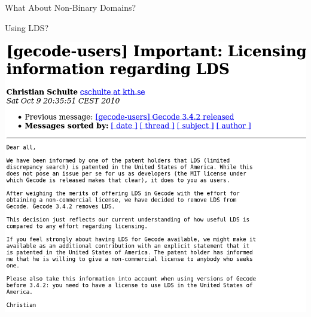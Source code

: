 \documentclass{beamer}
\begin{document}
\begin{frame}{What About Non-Binary Domains?}
\end{frame}

\begin{frame}{Using LDS?}
    \begin{center}
        \includegraphics*[keepaspectratio=true,scale=0.2]{images/lds-patent.png}
    \end{center}
\end{frame}
\end{document}
